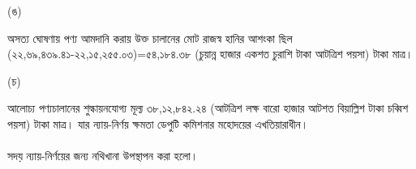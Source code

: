 \documentclass[12pt]{article}
\begin{document}
\begin{minipage}[t]{0.05\linewidth}
(ঙ)
\end{minipage}
\begin{minipage}[t]{0.90\linewidth}
অসত্য ঘোষণায় পণ্য আমদানি করায় উক্ত
চালানের মোট রাজস্ব হানির আশংকা ছিল
(২২,৬৯,৪৩৯.৪১-২২,১৫,২৫৫.০৩)=৫৪,১৮৪.৩৮
(চুয়ান্ন হাজার একশত চুরাশি টাকা আটত্রিশ পয়সা) টাকা মাত্র।
\end{minipage}
\begin{minipage}[t]{0.05\linewidth}
\hspace{1em}
\end{minipage}
\begin{minipage}[t]{0.05\linewidth}
(চ)
\end{minipage}
\begin{minipage}[t]{0.90\linewidth}
আলোচ্য পণ্যচালানের শুল্কায়নযোগ্য মূল্য
৩৮,১২,৮৪২.২৪ (আটত্রিশ লক্ষ বারো হাজার
আটশত বিয়াল্লিশ টাকা চব্বিশ পয়সা) টাকা মাত্র।
যার ন্যায়-নির্ণয় ক্ষমতা ডেপুটি কমিশনার
মহোদয়ের এখতিয়ারাধীন।
\\
\\
সদয় ন্যায়-নির্ণয়ের জন্য নথিখানা উপস্থাপন করা হলো।
\end{minipage}
\end{document}
